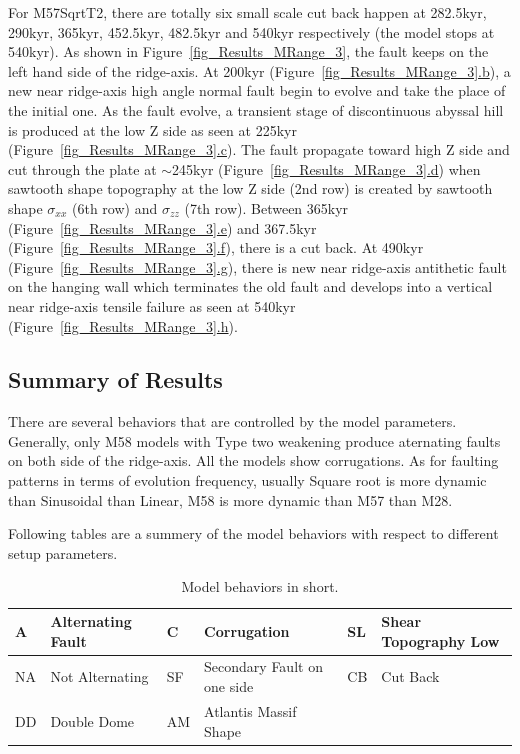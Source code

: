 For M57SqrtT2, there are totally six small scale cut back happen at 282.5kyr, 290kyr, 365kyr, 452.5kyr, 482.5kyr and 540kyr respectively (the model stops at 540kyr). As shown in Figure~\hyperref[fig_Results_MRange_3]{\ref{fig_Results_MRange_3}}, the fault keeps on the left hand side of the ridge-axis. At 200kyr (Figure~\hyperref[fig_Results_MRange_3]{\ref{fig_Results_MRange_3}.b}), a new near ridge-axis high angle normal fault begin to evolve and take the place of the initial one. As the fault evolve, a transient stage of discontinuous abyssal hill is produced at the low Z side as seen at 225kyr (Figure~\hyperref[fig_Results_MRange_3]{\ref{fig_Results_MRange_3}.c}). The fault propagate toward high Z side and cut through the plate at $\sim$245kyr (Figure~\hyperref[fig_Results_MRange_3]{\ref{fig_Results_MRange_3}.d}) when sawtooth shape topography at the low Z side (2nd row) is created by sawtooth shape $\sigma_{xx}$ (6th row) and $\sigma_{zz}$ (7th row). Between 365kyr (Figure~\hyperref[fig_Results_MRange_3]{\ref{fig_Results_MRange_3}.e}) and 367.5kyr (Figure~\hyperref[fig_Results_MRange_3]{\ref{fig_Results_MRange_3}.f}), there is a cut back. At 490kyr (Figure~\hyperref[fig_Results_MRange_3]{\ref{fig_Results_MRange_3}.g}), there is new near ridge-axis antithetic fault on the hanging wall which terminates the old fault and develops into a vertical near ridge-axis tensile failure as seen at 540kyr (Figure~\hyperref[fig_Results_MRange_3]{\ref{fig_Results_MRange_3}.h}).

\subsection{Summary of Results}
There are several behaviors that are controlled by the model parameters. Generally, only M58 models with Type two weakening produce aternating faults on both side of the ridge-axis. All the models show corrugations. As for faulting patterns in terms of evolution frequency, usually Square root is more dynamic than Sinusoidal than Linear, M58 is more dynamic than M57 than M28.

Following tables are a summery of the model behaviors with respect to different setup parameters.
 

\begin{table}[h]
\begin{small}
\begin{center}
\begin{tabular}{||l|l||l|l||l|l||}
\hline
A & Alternating Fault & C & Corrugation & SL & Shear Topography Low \\
\hline
NA& Not Alternating & SF & Secondary Fault on one side & CB & Cut Back   \\
\hline
DD &  Double Dome  & AM    & Atlantis Massif Shape &  &   \\
\hline
\end{tabular}
\end{center}
\end{small}
\caption{Model behaviors in short.}
\label{Tab1}
\end{table}

